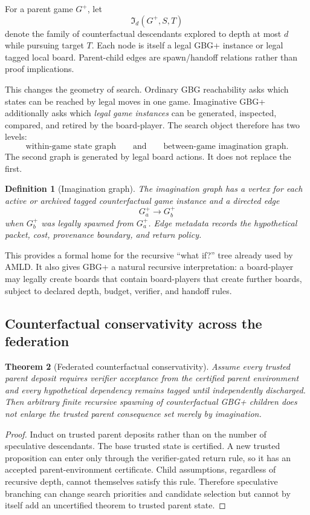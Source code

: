 \documentclass[11pt]{article}
\newtheorem{definition}{Definition}[section]
\newtheorem{theorem}[definition]{Theorem}
\begin{document}
For a parent game $G^+$, let
\[
\mathfrak I_d(G^+,S,T)
\]
denote the family of counterfactual descendants explored to depth at most $d$ while pursuing target $T$.  Each node is itself a legal GBG+ instance or legal tagged local board.  Parent-child edges are spawn/handoff relations rather than proof implications.

This changes the geometry of search.  Ordinary GBG reachability asks which states can be reached by legal moves in one game.  Imaginative GBG+ additionally asks which \emph{legal game instances} can be generated, inspected, compared, and retired by the board-player.  The search object therefore has two levels:
\[
\text{within-game state graph}
\qquad\text{and}\qquad
\text{between-game imagination graph}.
\]
The second graph is generated by legal board actions.  It does not replace the first.

\begin{definition}[Imagination graph]
The imagination graph has a vertex for each active or archived tagged counterfactual game instance and a directed edge
\[
G^+_a\longrightarrow G^+_b
\]
when $G^+_b$ was legally spawned from $G^+_a$.  Edge metadata records the hypothetical packet, cost, provenance boundary, and return policy.
\end{definition}

This provides a formal home for the recursive ``what if?'' tree already used by AMLD.  It also gives GBG+ a natural recursive interpretation: a board-player may legally create boards that contain board-players that create further boards, subject to declared depth, budget, verifier, and handoff rules.

\subsection{Counterfactual conservativity across the federation}

\begin{theorem}[Federated counterfactual conservativity]
Assume every trusted parent deposit requires verifier acceptance from the certified parent environment and every hypothetical dependency remains tagged until independently discharged.  Then arbitrary finite recursive spawning of counterfactual GBG+ children does not enlarge the trusted parent consequence set merely by imagination.
\end{theorem}

\begin{proof}
Induct on trusted parent deposits rather than on the number of speculative descendants.  The base trusted state is certified.  A new trusted proposition can enter only through the verifier-gated return rule, so it has an accepted parent-environment certificate.  Child assumptions, regardless of recursive depth, cannot themselves satisfy this rule.  Therefore speculative branching can change search priorities and candidate selection but cannot by itself add an uncertified theorem to trusted parent state.
\end{proof}
\end{document}
